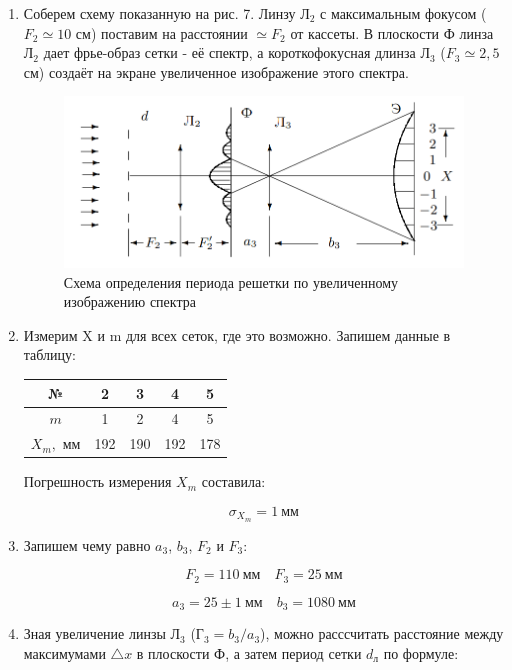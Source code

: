 \documentclass[a4paper, 12pt]{article}%
\begin{document}
\begin{enumerate}

\item Соберем схему показанную на рис. 7. Линзу $\text{Л}_2$ с максимальным фокусом ($F_2 \simeq 10$ см) поставим на расстоянии $\simeq F_2$ от кассеты. В плоскости Ф линза $\text{Л}_2$ дает фрье-образ сетки - её спектр, а короткофокусная длинза $\text{Л}_3$ ($F_3 \simeq 2,5$ см) создаёт на экране увеличенное изображение этого спектра.

\begin{figure}[h!]
    \centering
	\includegraphics[width = 0.8\linewidth]{images/7.png}
	\caption{Схема определения периода решетки по увеличенному изображению спектра}
\end{figure}

\item Измерим X и m для всех сеток, где это возможно. Запишем данные в таблицу:

\begin{center}
\begin{tabular}{|c|c|c|c|c|}
\hline 
№ & 2 & 3 & 4 & 5 \\ 
\hline 
$m$ & 1 & 2 & 4 & 5 \\ 
\hline 
$X_m,$ мм  & 192 & 190 & 192 & 178 \\ 
\hline 
\end{tabular} 
\end{center}

Погрешность измерения $X_m$ составила:

\[\sigma_{X_m} = 1 \: \text{мм}\]

\item Запишем чему равно $a_3$, $b_3$, $F_2$ и $F_3$:

\[F_2 = 110 \: \text{мм} \quad F_3 = 25 \: \text{мм}\]

\[a_3 = 25 \pm 1 \: \text{мм} \quad b_3 = 1080 \: \text{мм}\]

\item Зная увеличение линзы $\text{Л}_3$ ($\text{Г}_3 = b_3 / a_3$), можно расссчитать расстояние между максимумами $\bigtriangleup x$ в плоскости Ф, а затем период сетки $d_{\text{л}}$ по формуле:


\end{enumerate}
\end{document}
